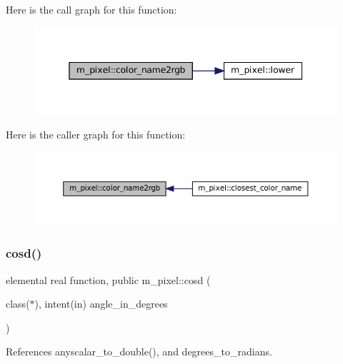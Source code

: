 Here is the call graph for this function\+:
\nopagebreak
\begin{figure}[H]
\begin{center}
\leavevmode
\includegraphics[width=345pt]{namespacem__pixel_aee26ac45961d4093d2e472fcb6e1887d_cgraph}
\end{center}
\end{figure}
Here is the caller graph for this function\+:
\nopagebreak
\begin{figure}[H]
\begin{center}
\leavevmode
\includegraphics[width=350pt]{namespacem__pixel_aee26ac45961d4093d2e472fcb6e1887d_icgraph}
\end{center}
\end{figure}
\mbox{\label{namespacem__pixel_a312c40bfbd03b2bbe6f85bc5efca6ce3}} 
\subsubsection{\texorpdfstring{cosd()}{cosd()}}
{\footnotesize\ttfamily elemental real function, public m\+\_\+pixel\+::cosd (\begin{DoxyParamCaption}\item[{class($\ast$), intent(in)}]{angle\+\_\+in\+\_\+degrees }\end{DoxyParamCaption})}



References anyscalar\+\_\+to\+\_\+double(), and degrees\+\_\+to\+\_\+radians.


